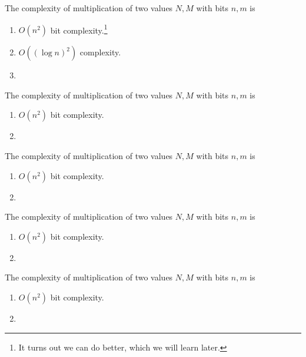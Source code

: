 \documentclass{article}
\begin{document}
    \begin{theorem}
      The complexity of multiplication of two values $N, M$ with bits $n, m$ is 
      \begin{enumerate}
        \item $O(n^2)$ bit complexity.\footnote{It turns out we can do better, which we will learn later.} 
        \item $O((\log n)^2)$ complexity. 
        \item 
      \end{enumerate}
    \end{theorem}

    \begin{theorem}
      The complexity of multiplication of two values $N, M$ with bits $n, m$ is 
      \begin{enumerate}
        \item $O(n^2)$ bit complexity. 
        \item 
      \end{enumerate}
    \end{theorem}

    \begin{theorem}
      The complexity of multiplication of two values $N, M$ with bits $n, m$ is 
      \begin{enumerate}
        \item $O(n^2)$ bit complexity. 
        \item 
      \end{enumerate}
    \end{theorem}

    \begin{theorem}
      The complexity of multiplication of two values $N, M$ with bits $n, m$ is 
      \begin{enumerate}
        \item $O(n^2)$ bit complexity. 
        \item 
      \end{enumerate}
    \end{theorem}

    \begin{theorem}
      The complexity of multiplication of two values $N, M$ with bits $n, m$ is 
      \begin{enumerate}
        \item $O(n^2)$ bit complexity. 
        \item 
      \end{enumerate}
    \end{theorem}
\end{document}
